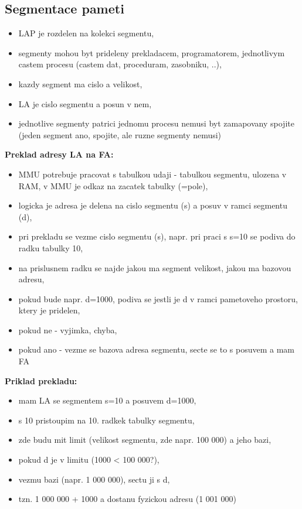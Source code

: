 \documentclass[a4paper, 11pt]{article}
\begin{document}
\subsection{Segmentace pameti}
\begin{itemize}
    \item LAP je rozdelen na kolekci segmentu,
    \item segmenty mohou byt prideleny prekladacem, programatorem, jednotlivym castem procesu (castem dat, proceduram, zasobniku, ..),
    \item kazdy segment ma cislo a velikost,
    \item LA je cislo segmentu a posun v nem,
    \item jednotlive segmenty patrici jednomu procesu nemusi byt zamapovany spojite (jeden segment ano, spojite, ale ruzne segmenty nemusi) \\
\end{itemize}

\textbf{Preklad adresy LA na FA:}
\begin{itemize}
    \item MMU potrebuje pracovat s tabulkou udaji - tabulkou segmentu, ulozena v RAM, v MMU je odkaz na zacatek tabulky (=pole),
    \item logicka je adresa je delena na cislo segmentu (s) a posuv v ramci segmentu (d),
    \item pri prekladu se vezme cislo segmentu (s), napr. pri praci s s=10 se podiva do radku tabulky 10,
    \item na prislusnem radku se najde jakou ma segment velikost, jakou ma bazovou adresu,
    \item pokud bude napr. d=1000, podiva se jestli je d v ramci pametoveho prostoru, ktery je pridelen,
    \item pokud ne - vyjimka, chyba,
    \item pokud ano - vezme se bazova adresa segmentu, secte se to s posuvem a mam FA \\
\end{itemize}

\textbf{Priklad prekladu:}
\begin{itemize}
    \item mam LA se segmentem s=10 a posuvem d=1000,
    \item s 10 pristoupim na 10. radkek tabulky segmentu,
    \item zde budu mit limit (velikost segmentu, zde napr. 100 000) a jeho bazi,
    \item pokud d je v limitu (1000 < 100 000?),
    \item vezmu bazi (napr. 1 000 000), sectu ji s d,
    \item tzn. 1 000 000 + 1000 a dostanu fyzickou adresu (1 001 000) \\
\end{itemize}
\end{document}
